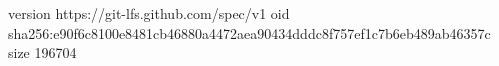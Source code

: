 version https://git-lfs.github.com/spec/v1
oid sha256:e90f6c8100e8481cb46880a4472aea90434dddc8f757ef1c7b6eb489ab46357c
size 196704
